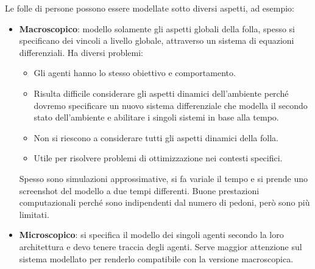 Le folle di persone possono essere modellate sotto diversi aspetti, ad esempio:
\begin{itemize}
      \item \textbf{Macroscopico}: modello solamente gli aspetti globali della
            folla, spesso si specificano dei vincoli a livello globale, attraverso
            un sistema di equazioni differenziali. Ha diversi problemi:
            \begin{itemize}
                  \item Gli agenti hanno lo stesso obiettivo e comportamento.
                  \item Risulta difficile considerare gli aspetti dinamici
                        dell'ambiente perché dovremo specificare un nuovo sistema
                        differenziale che modella il secondo stato dell'ambiente
                        e abilitare i singoli sistemi in base alla tempo.
                  \item Non si riescono a considerare tutti gli aspetti dinamici
                        della folla.
                  \item Utile per risolvere problemi di ottimizzazione nei contesti
                        specifici.
            \end{itemize}
            Spesso sono simulazioni approssimative, si fa variale il tempo e si
            prende uno screenshot del modello a due tempi differenti. Buone
            prestazioni computazionali perché sono indipendenti dal numero
            di pedoni, però sono più limitati.
      \item \textbf{Microscopico}: si specifica il modello dei singoli agenti
            secondo la loro architettura e devo tenere traccia degli agenti.
            Serve maggior attenzione sul sistema modellato per renderlo
            compatibile con la versione macroscopica.


\end{itemize}

